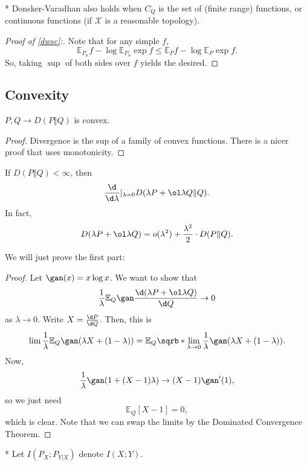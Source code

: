 \begin{cor}*
	Donsker-Varadhan also holds when $C_Q$ is the set of  (finite range) functions, or continuous functions (if $\mathcal X$ is a reasonable topology).
\end{cor}

\begin{proof}
	[Proof of \ref{dwsc}:]
	Note that for any simple $f$, \[
		\mathbb E_{P_n} f - \log \mathbb E_{P_n} \exp f \leq \mathbb E_P f - \log \mathbb E_P \exp f.
	\]
	So, taking $\sup$ of both sides over $f$ yields the desired.
\end{proof}

\subsection{Convexity}

\begin{cor}
	$P,Q\to D(P\Vert Q)$ is convex.
\end{cor}

\begin{proof}
	Divergence is the sup of a family of convex functions. There is a nicer proof that uses monotonicity.
\end{proof}

\begin{fact}
	If $D(P\Vert Q) < \infty$, then \[
		\frac{\d}{\d\lambda} |_{\lambda = 0} D(\lambda P + \ol \lambda Q\Vert Q).
	\]
	In fact, \[
		D(\lambda P + \ol \lambda Q) = o(\lambda^2) + \frac{\lambda^2}{2} \cdot D(P\Vert Q).
	\]
\end{fact}

We will just prove the first part:

\begin{proof}
	Let $\gan(x) = x\log x$. We want to show that \[
		\frac 1\lambda \mathbb E_Q \gan \frac{\d(\lambda P + \ol \lambda Q)}{\d Q} \to 0
	\]as $\lambda \to 0$.
	Write $X = \frac{\d P}{\d Q}$. Then, this is \[
		\lim \frac 1{\lambda} \mathbb E_Q\gan (\lambda X + (1-\lambda)) = \mathbb E_Q \sqrb*{\lim_{\lambda \to 0} \frac 1\lambda \gan(\lambda X + (1-\lambda))}.
	\]
	Now, \[
		\frac 1\lambda \gan(1 + (X-1)\lambda) \to (X-1)\gan'(1),
	\]so we just need \[
		\mathbb E_Q [X-1] = 0,
	\]which is clear.
	Note that we can swap the limits by the Dominated Convergence Theorem.
\end{proof}

\begin{defn}*
	Let $I(P_X;P_{Y|X})$ denote $I(X;Y)$.
\end{defn}

